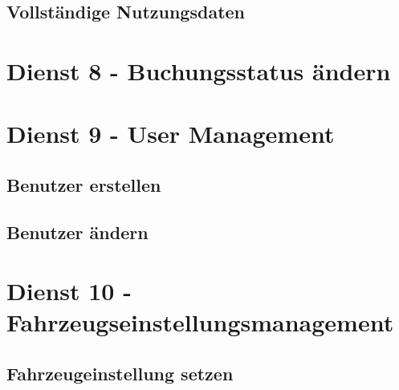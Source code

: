 \subsection*{Vollständige Nutzungsdaten}
\label{subsec:Nachrichten:Dienst5:CompleteConsumption}






\section{Dienst 8 - Buchungsstatus ändern}
\label{sec:Nachrichten:Dienst8}





\section{Dienst 9 - User Management}
\label{sec:Nachrichten:Dienst9}

\subsection*{Benutzer erstellen}
\label{subsec:Nachrichten:Dienst9:CreateUser}





\subsection*{Benutzer ändern}
\label{subsec:Nachrichten:Dienst9:ChangeUser}






\section{Dienst 10 - Fahrzeugseinstellungsmanagement}
\label{sec:Nachrichten:Dienst10}

\subsection*{Fahrzeugeinstellung setzen}
\label{subsec:Nachrichten:Dienst10:SetBookingSettings}





